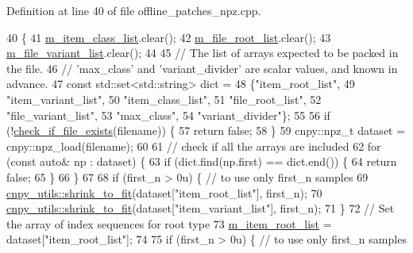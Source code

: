 Definition at line 40 of file offline\+\_\+patches\+\_\+npz.\+cpp.


\begin{DoxyCode}
40                                                                        \{
41   \hyperlink{classlbann_1_1offline__patches__npz_a5f90dc1b898f8ad9d7ea16c188738419}{m\_item\_class\_list}.clear();
42   \hyperlink{classlbann_1_1offline__patches__npz_a515ef05ef0679f3b6f1197d1ab47bfb3}{m\_file\_root\_list}.clear();
43   \hyperlink{classlbann_1_1offline__patches__npz_a164d2bd134dc8c3946dc28d6ec5da0ec}{m\_file\_variant\_list}.clear();
44 
45   \textcolor{comment}{// The list of arrays expected to be packed in the file.}
46   \textcolor{comment}{// 'max\_class' and 'variant\_divider' are scalar values, and known in advance.}
47   \textcolor{keyword}{const} std::set<std::string> dict =
48     \{\textcolor{stringliteral}{"item\_root\_list"},
49      \textcolor{stringliteral}{"item\_variant\_list"},
50      \textcolor{stringliteral}{"item\_class\_list"},
51      \textcolor{stringliteral}{"file\_root\_list"},
52      \textcolor{stringliteral}{"file\_variant\_list"},
53      \textcolor{stringliteral}{"max\_class"},
54      \textcolor{stringliteral}{"variant\_divider"}\};
55 
56   \textcolor{keywordflow}{if} (!\hyperlink{namespacelbann_a4fac6c6483965395fa79d31061485f9f}{check\_if\_file\_exists}(filename)) \{
57     \textcolor{keywordflow}{return} \textcolor{keyword}{false};
58   \}
59   cnpy::npz\_t dataset = cnpy::npz\_load(filename);
60 
61   \textcolor{comment}{// check if all the arrays are included}
62   \textcolor{keywordflow}{for} (\textcolor{keyword}{const} \textcolor{keyword}{auto}& np : dataset) \{
63     \textcolor{keywordflow}{if} (dict.find(np.first) == dict.end()) \{
64       \textcolor{keywordflow}{return} \textcolor{keyword}{false};
65     \}
66   \}
67 
68   \textcolor{keywordflow}{if} (first\_n > 0u) \{ \textcolor{comment}{// to use only first\_n samples}
69     \hyperlink{namespacelbann_1_1cnpy__utils_ab19ad0a361570b7e78e203c02d6ba13a}{cnpy\_utils::shrink\_to\_fit}(dataset[\textcolor{stringliteral}{"item\_root\_list"}], first\_n);
70     \hyperlink{namespacelbann_1_1cnpy__utils_ab19ad0a361570b7e78e203c02d6ba13a}{cnpy\_utils::shrink\_to\_fit}(dataset[\textcolor{stringliteral}{"item\_variant\_list"}], first\_n);
71   \}
72   \textcolor{comment}{// Set the array of index sequences for root type}
73   \hyperlink{classlbann_1_1offline__patches__npz_a5d61c89e80f8e67b4850fb72792ce862}{m\_item\_root\_list} = dataset[\textcolor{stringliteral}{"item\_root\_list"}];
74 
75   \textcolor{keywordflow}{if} (first\_n > 0u) \{ \textcolor{comment}{// to use only first\_n samples}

\end{DoxyCode}

